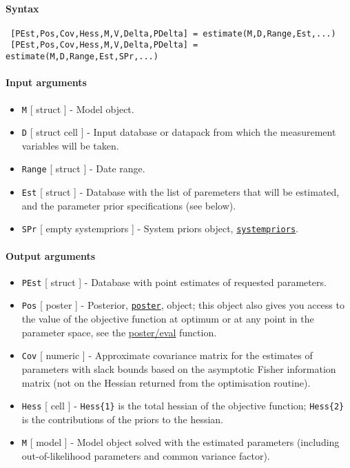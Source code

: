 


	\paragraph{Syntax}
 
 \begin{verbatim}
 [PEst,Pos,Cov,Hess,M,V,Delta,PDelta] = estimate(M,D,Range,Est,...)
 [PEst,Pos,Cov,Hess,M,V,Delta,PDelta] = estimate(M,D,Range,Est,SPr,...)
 \end{verbatim}
 
 \paragraph{Input arguments}
 
 \begin{itemize}
 \item
   \texttt{M} {[} struct {]} - Model object.
 \item
   \texttt{D} {[} struct \textbar{} cell {]} - Input database or datapack
   from which the measurement variables will be taken.
 \item
   \texttt{Range} {[} struct {]} - Date range.
 \item
   \texttt{Est} {[} struct {]} - Database with the list of paremeters
   that will be estimated, and the parameter prior specifications (see
   below).
 \item
   \texttt{SPr} {[} empty \textbar{} systempriors {]} - System priors
   object, \href{systempriors/Contents}{\texttt{systempriors}}.
 \end{itemize}
 
 \paragraph{Output arguments}
 
 \begin{itemize}
 \item
   \texttt{PEst} {[} struct {]} - Database with point estimates of
   requested parameters.
 \item
   \texttt{Pos} {[} poster {]} - Posterior,
   \href{poster/Contents}{\texttt{poster}}, object; this object also
   gives you access to the value of the objective function at optimum or
   at any point in the parameter space, see the \url{poster/eval}
   function.
 \item
   \texttt{Cov} {[} numeric {]} - Approximate covariance matrix for the
   estimates of parameters with slack bounds based on the asymptotic
   Fisher information matrix (not on the Hessian returned from the
   optimisation routine).
 \item
   \texttt{Hess} {[} cell {]} - \texttt{Hess\{1\}} is the total hessian
   of the objective function; \texttt{Hess\{2\}} is the contributions of
   the priors to the hessian.
 \item
   \texttt{M} {[} model {]} - Model object solved with the estimated
   parameters (including out-of-likelihood parameters and common variance
   factor).
 \end{itemize}
 

